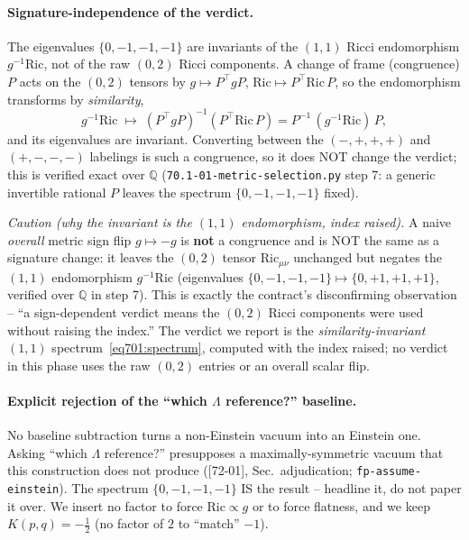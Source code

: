 \paragraph{Signature-independence of the verdict.} The eigenvalues
$\{0,-1,-1,-1\}$ are invariants of the \emph{$(1,1)$} Ricci endomorphism
$g^{-1}\mathrm{Ric}$, not of the raw $(0,2)$ Ricci components. A change of frame
(congruence) $P$ acts on the $(0,2)$ tensors by $g\mapsto P^{\!\top}gP$,
$\mathrm{Ric}\mapsto P^{\!\top}\mathrm{Ric}\,P$, so the endomorphism transforms by
\emph{similarity},
\begin{equation}
  g^{-1}\mathrm{Ric}\;\longmapsto\;(P^{\!\top}gP)^{-1}(P^{\!\top}\mathrm{Ric}\,P)
  = P^{-1}\,(g^{-1}\mathrm{Ric})\,P,
  \label{eq701:similarity}
\end{equation}
and its eigenvalues are invariant. Converting between the $(-,+,+,+)$ and $(+,-,-,-)$
labelings is such a congruence, so it does NOT change the verdict; this is verified
exact over $\mathbb{Q}$ (\texttt{70.1-01-metric-selection.py} step 7: a generic
invertible rational $P$ leaves the spectrum $\{0,-1,-1,-1\}$ fixed).

\emph{Caution (why the invariant is the $(1,1)$ endomorphism, index raised).} A naive
\emph{overall} metric sign flip $g\mapsto-g$ is \textbf{not} a congruence and is NOT the
same as a signature change: it leaves the $(0,2)$ tensor $\mathrm{Ric}_{\mu\nu}$
unchanged but negates the $(1,1)$ endomorphism $g^{-1}\mathrm{Ric}$ (eigenvalues
$\{0,-1,-1,-1\}\mapsto\{0,+1,+1,+1\}$, verified over $\mathbb{Q}$ in step 7). This is
exactly the contract's disconfirming observation -- ``a sign-dependent verdict means the
$(0,2)$ Ricci components were used without raising the index.'' The verdict we report is
the \emph{similarity-invariant} $(1,1)$ spectrum~\eqref{eq701:spectrum}, computed with
the index raised; no verdict in this phase uses the raw $(0,2)$ entries or an overall
scalar flip.

\paragraph{Explicit rejection of the ``which $\Lambda$ reference?'' baseline.} No
baseline subtraction turns a non-Einstein vacuum into an Einstein one. Asking ``which
$\Lambda$ reference?'' presupposes a maximally-symmetric vacuum that this construction
does not produce ([72-01], Sec.~adjudication; \texttt{fp-assume-einstein}). The spectrum
$\{0,-1,-1,-1\}$ IS the result -- headline it, do not paper it over. We insert no factor
to force $\mathrm{Ric}\propto g$ or to force flatness, and we keep $K(p,q)=-\tfrac12$
(no factor of $2$ to ``match'' $-1$).

